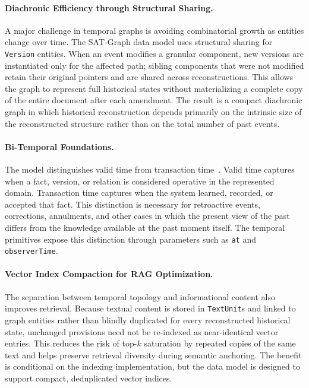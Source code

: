 \documentclass[11pt]{article}
\begin{document}
\paragraph{Diachronic Efficiency through Structural Sharing.}
A major challenge in temporal graphs is avoiding combinatorial growth as entities change over time. The SAT-Graph data model uses structural sharing for \texttt{Version} entities. When an event modifies a granular component, new versions are instantiated only for the affected path; sibling components that were not modified retain their original pointers and are shared across reconstructions. This allows the graph to represent full historical states without materializing a complete copy of the entire document after each amendment. The result is a compact diachronic graph in which historical reconstruction depends primarily on the intrinsic size of the reconstructed structure rather than on the total number of past events.

\paragraph{Bi-Temporal Foundations.}
The model distinguishes valid time from transaction time~\cite{kulkarni2012temporal}. Valid time captures when a fact, version, or relation is considered operative in the represented domain. Transaction time captures when the system learned, recorded, or accepted that fact. This distinction is necessary for retroactive events, corrections, annulments, and other cases in which the present view of the past differs from the knowledge available at the past moment itself. The temporal primitives expose this distinction through parameters such as \texttt{at} and \texttt{observerTime}.

\paragraph{Vector Index Compaction for RAG Optimization.}
The separation between temporal topology and informational content also improves retrieval. Because textual content is stored in \texttt{TextUnit}s and linked to graph entities rather than blindly duplicated for every reconstructed historical state, unchanged provisions need not be re-indexed as near-identical vector entries. This reduces the risk of top-$k$ saturation by repeated copies of the same text and helps preserve retrieval diversity during semantic anchoring. The benefit is conditional on the indexing implementation, but the data model is designed to support compact, deduplicated vector indices.
\end{document}

